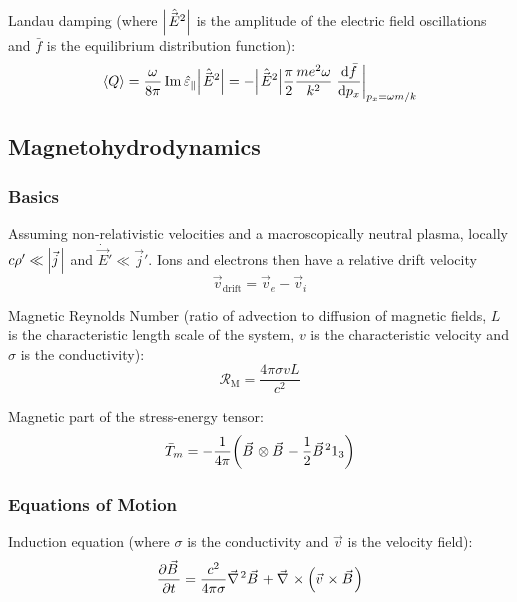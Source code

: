 			\noindent
			Landau damping (where $\abs{\hat{\vec{E}}^2}$ is the amplitude of the electric field oscillations and $\bar{f}$ is the equilibrium distribution function):
			\begin{equation}
				\avg{Q}
				= \frac{\omega}{8 \pi} \Im \hat{\varepsilon}_\parallel \abs{\hat{\vec{E}}^2}
				= - \abs{\hat{\vec{E}}^2} \frac{\pi}{2} \frac{m e^2 \omega}{k^2} \eval{\dv{\bar{f}}{p_x}}_{p_x = \omega m /k}
			\end{equation}

	\subsection{Magnetohydrodynamics}
		\subsubsection{Basics}
			Assuming non-relativistic velocities and a macroscopically neutral plasma, \ie locally $c\rho' \ll \abs{\vec{j}}$ and $\dot{\vec{E}}' \ll \vec{j}'$.
			Ions and electrons then have a relative drift velocity
			\begin{equation}
				\vec{v}_{\text{drift}} = \vec{v}_e - \vec{v}_i
			\end{equation}

			\noindent
			Magnetic Reynolds Number (ratio of advection to diffusion of magnetic fields, $L$ is the characteristic length scale of the system, $v$ is the characteristic velocity and $\sigma$ is the conductivity):
			\begin{equation}
				\mathcal{R}_\text{M} = \frac{4\pi\sigma v L}{c^2}
			\end{equation}

			\noindent
			Magnetic part of the stress-energy tensor:
			\begin{equation}
				\bar{T}_m = -\frac{1}{4\pi} \qty(\vec{B} \otimes \vec{B} - \frac{1}{2}\vec{B}^2 1_3)
			\end{equation}

		\subsubsection{Equations of Motion}
			Induction equation (where $\sigma$ is the conductivity and $\vec{v}$ is the velocity field):
			\begin{equation}
				\pdv{\vec{B}}{t} = \frac{c^2}{4\pi\sigma} \Nabla^2 \vec{B} + \Nabla\times\qty(\vec{v}\times\vec{B})
			\end{equation}

